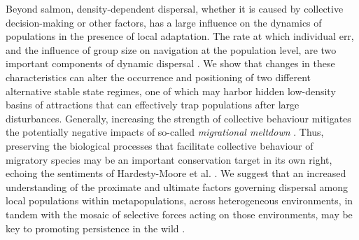 \documentclass{revtex4}
\begin{document}
Beyond salmon, density-dependent dispersal, whether it is caused by collective decision-making or other factors, has a large influence on the dynamics of populations in the presence of local adaptation.
The rate at which individual err, and the influence of group size on navigation at the population level, are two important components of dynamic dispersal \citep{Berdahl:2016dx}.
We show that changes in these characteristics can alter the occurrence and positioning of two different alternative stable state regimes, one of which may harbor hidden low-density basins of attractions that can effectively trap populations after large disturbances.
Generally, increasing the strength of collective behaviour mitigates the potentially negative impacts of so-called \emph{migrational meltdown} \citep{Ronce:2001dp}.
Thus, preserving the biological processes that facilitate collective behaviour of migratory species may be an important conservation target in its own right, echoing the sentiments of Hardesty-Moore et al. \citep{HardestyMoore:wg}. 
We suggest that an increased understanding of the proximate and ultimate factors governing dispersal among local populations within metapopulations, across heterogeneous environments, in tandem with the mosaic of selective forces acting on those environments, may be key to promoting persistence in the wild \cite{Westley:uh}.
\\ \\
\end{document}
